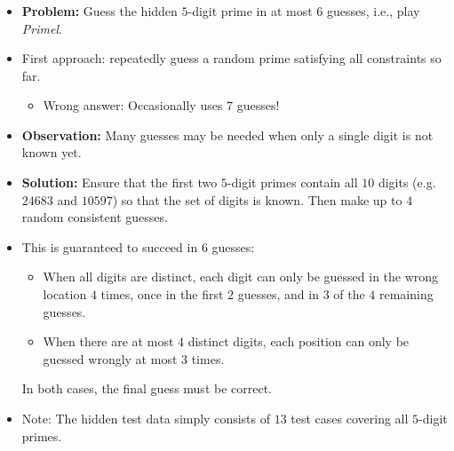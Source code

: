 \begin{frame}
	\frametitle{\problemtitle}
    \begin{itemize}
		\item<+-> \textbf{Problem:} Guess the hidden
            $5$-digit prime in at most $6$ guesses, i.e., play \emph{Primel}.
        \item<+-> First approach: repeatedly guess a random prime satisfying all
            constraints so far.
        \begin{itemize}
          \item<+-> Wrong answer: Occasionally uses $7$ guesses!
        \end{itemize}
		\item<+-> \textbf{Observation:} Many guesses may be needed when only a
            single digit is not known yet.
        \item<+-> \textbf{Solution:} Ensure that the first two $5$-digit primes
            contain all $10$ digits (e.g. $24683$ and $10597$) so that the set
            of digits is known. Then make up to $4$ random consistent guesses.
        \item<+-> This is guaranteed to succeed in $6$ guesses:
            \begin{itemize}
                \item When all digits are distinct, each digit can only be
                    guessed in the wrong location $4$ times, once in the first
                    $2$ guesses, and in $3$ of the $4$ remaining guesses.
                \item When there are at most $4$ distinct digits, each position
                    can only be guessed wrongly at most $3$ times.
            \end{itemize}
            In both cases, the final guess must be correct.
        \item<+-> Note: The hidden test data simply consists of $13$
            test cases covering all $5$-digit primes.
    \end{itemize}
    \solvestats
\end{frame}
